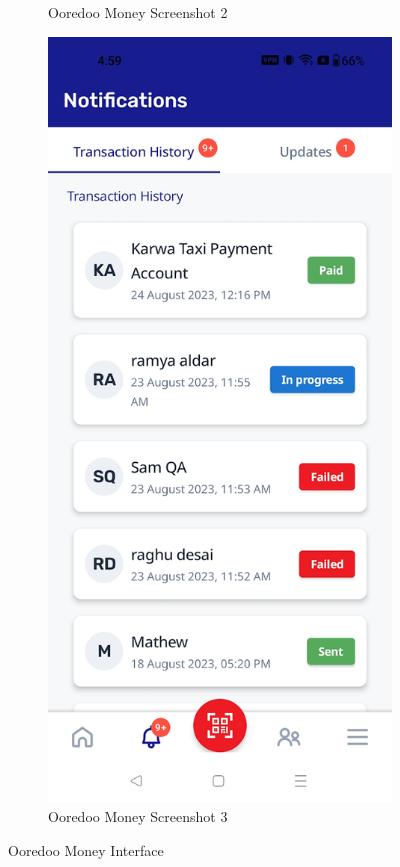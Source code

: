 \begin{figure}[!htb]
\begin{subfigure}[b]{0.32\textwidth}
        \caption{Ooredoo Money Screenshot 2}
        \label{fig:ooredoo_2}
    \end{subfigure}
    \hfill
    \begin{subfigure}[b]{0.32\textwidth}
        \centering
        \includegraphics[width=\textwidth]{images/ooredoo_money_screenshot_3.png}
        \caption{Ooredoo Money Screenshot 3}
        \label{fig:ooredoo_3}
    \end{subfigure}
    \caption{Ooredoo Money Interface}
    \label{fig:ooredoo_interface}
\end{figure}

